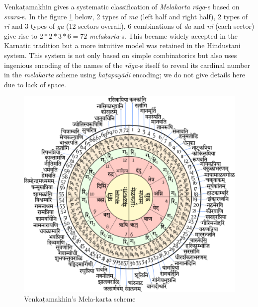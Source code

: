 Venkaṭamakhin gives a systematic classification of \textsl{Melakarta rāga}-s based on \textsl{svara}-s. In the figure \ref{chap3-fig5} below, 2 types of \textsl{ma} (left half and right half), 2 types of \textsl{ri} and 3 types of \textsl{ga} (12 sectors overall), 6 combinations of \textsl{da} and \textsl{ni} (each sector) give rise to $2*2*3*6=72$ \textsl{melakarta}-s. This became widely accepted in the Karnatic
 tradition but a more intuitive model was retained in the Hindustani system. This system is not only based on simple combinatorics but also uses ingenious encoding of the names of the \textsl{rāga}-s itself to reveal its cardinal number in the \textsl{melakarta} scheme using \textsl{kaṭapayādi} encoding; we do not give details here due to lack of space.

\begin{figure}[ht]
\centering
\includegraphics[scale=.4]{figures/7.eps}
\caption{Venkaṭamakhin’s Mela-karta scheme}\label{chap3-fig5}
\end{figure}

